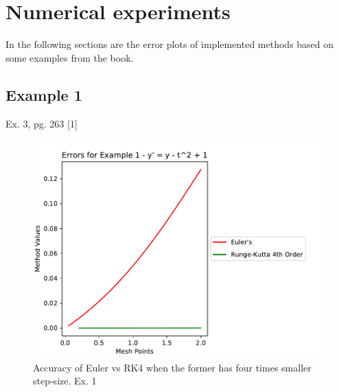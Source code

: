 \documentclass[11pt]{article}	%
\begin{document}

\section{Numerical experiments}
In the following sections are the error plots of implemented methods based on some examples from the book.

\newpage
\subsection{Example 1}
Ex. 3, pg. 263 [1]
\begin{figure}[H]
\centering
\includegraphics[width=.45\textwidth]{euler_rk4_1}
\caption{Accuracy of Euler vs RK4 when the former has four times smaller step-size. Ex. 1}
\label{fig:euler_rk4_1}
\end{figure}
\end{document}
